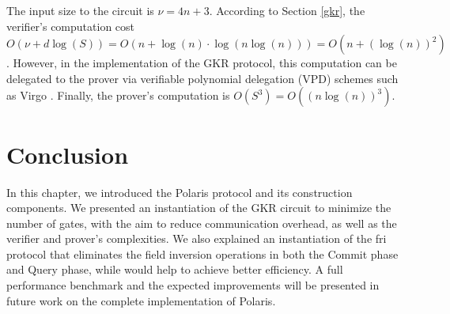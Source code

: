 The input size to the circuit is $\nu = 4n + 3$. According to Section \ref{gkr}, the verifier's computation cost $O(\nu + d\log(S)) = O(n + \log(n) \cdot \log(n\log(n))) = O(n + (\log(n))^2)$. However, in the implementation of the GKR protocol, this computation can be delegated to the prover via verifiable polynomial delegation (VPD) schemes such as Virgo \cite{Zhang2020Virgo}. Finally, the prover's computation is $O(S^3)=O((n\log(n))^3)$.

\section{Conclusion}
In this chapter, we introduced the Polaris protocol and its construction components. We presented an instantiation of the GKR circuit to minimize the number of gates, with the aim to reduce communication overhead, as well as the verifier and prover's complexities. We also explained an instantiation of the \gls{fri} protocol that eliminates the field inversion operations in both the Commit phase and Query phase, while would help to achieve better efficiency.  A full performance benchmark and the expected improvements will be presented in future work on the complete implementation of Polaris.
